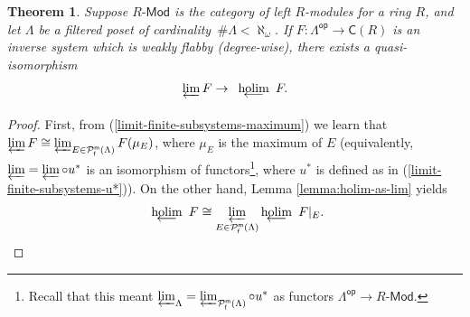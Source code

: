 \documentclass[reqno,11pt]{amsart}
\theoremstyle{plain}
\newtheorem{thm}{Theorem}[section]
\theoremstyle{remark}
\theoremstyle{definition}
\numberwithin{equation}{thm}
\newcommand{\CP}{\mathcal{P}}
\newcommand{\CCC}{\boldsymbol{\mathsf{C}}}
\newcommand{\holim}[1]{\begin{array}[t]{c} {\rm holim}\\[-7.5 pt]
		{\longleftarrow} \end{array}}
\newcommand{\md}{\text{-}\mathsf{Mod}}
\newcommand{\op}{\mathsf{op}}
\DeclareMathOperator{\pfinmax}{\CP_{\mathsf{f}}^{\mathsf{m}}}
\begin{document}
	\begin{thm}\label{thm:quis-abelian-cat-ab4*-gen}
		Suppose $R\md$ is the category of left $R$-modules for a ring $R$, and let $\Lambda$ be a filtered poset of cardinality \,$\#\Lambda < \aleph_\omega$. If $F \colon \Lambda^\op \to \CCC(R)$ is an inverse system which is weakly flabby (degree-wise), there exists a quasi-isomorphism 
		\[ \varprojlim F \to \holim{} F.\]
	\end{thm}
	\begin{proof}
		First, from (\ref{limit-finite-subsystems-maximum}) we learn that $\varprojlim F \cong \varprojlim_{E \in \pfinmax(\Lambda)}F(\mu_E)$, where $\mu_E$ is the maximum of $E$ (equivalently, $\varprojlim = \varprojlim \circ u^*$ is an isomorphism of functors\footnote{Recall that this meant $\varprojlim_{\Lambda} = \varprojlim_{\pfinmax(\Lambda)} \circ u^*$ as functors $\Lambda^\op \to R\md$.}, where $u^*$ is defined as in (\ref{limit-finite-subsystems-u*})). On the other hand, Lemma \ref{lemma:holim-as-lim} yields
		\[
			\holim{} F \cong \varprojlim_{E \in \pfinmax(\Lambda)} \!\!\! \holim{}F\vert_E.
		\]
	

\end{proof}
\end{document}
